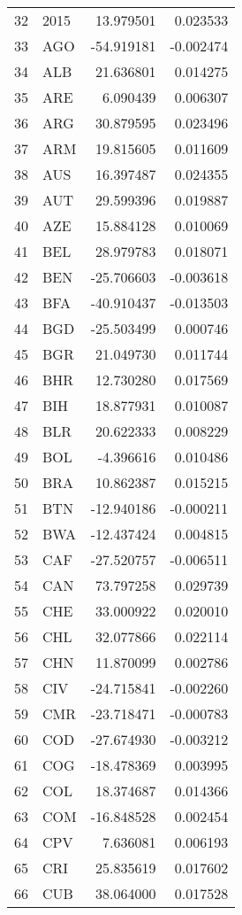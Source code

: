 \begin{tabular}{llrr}
32 & 2015 & 13.979501 & 0.023533 \\
33 & AGO & -54.919181 & -0.002474 \\
34 & ALB & 21.636801 & 0.014275 \\
35 & ARE & 6.090439 & 0.006307 \\
36 & ARG & 30.879595 & 0.023496 \\
37 & ARM & 19.815605 & 0.011609 \\
38 & AUS & 16.397487 & 0.024355 \\
39 & AUT & 29.599396 & 0.019887 \\
40 & AZE & 15.884128 & 0.010069 \\
41 & BEL & 28.979783 & 0.018071 \\
42 & BEN & -25.706603 & -0.003618 \\
43 & BFA & -40.910437 & -0.013503 \\
44 & BGD & -25.503499 & 0.000746 \\
45 & BGR & 21.049730 & 0.011744 \\
46 & BHR & 12.730280 & 0.017569 \\
47 & BIH & 18.877931 & 0.010087 \\
48 & BLR & 20.622333 & 0.008229 \\
49 & BOL & -4.396616 & 0.010486 \\
50 & BRA & 10.862387 & 0.015215 \\
51 & BTN & -12.940186 & -0.000211 \\
52 & BWA & -12.437424 & 0.004815 \\
53 & CAF & -27.520757 & -0.006511 \\
54 & CAN & 73.797258 & 0.029739 \\
55 & CHE & 33.000922 & 0.020010 \\
56 & CHL & 32.077866 & 0.022114 \\
57 & CHN & 11.870099 & 0.002786 \\
58 & CIV & -24.715841 & -0.002260 \\
59 & CMR & -23.718471 & -0.000783 \\
60 & COD & -27.674930 & -0.003212 \\
61 & COG & -18.478369 & 0.003995 \\
62 & COL & 18.374687 & 0.014366 \\
63 & COM & -16.848528 & 0.002454 \\
64 & CPV & 7.636081 & 0.006193 \\
65 & CRI & 25.835619 & 0.017602 \\
66 & CUB & 38.064000 & 0.017528 \\

\end{tabular}
